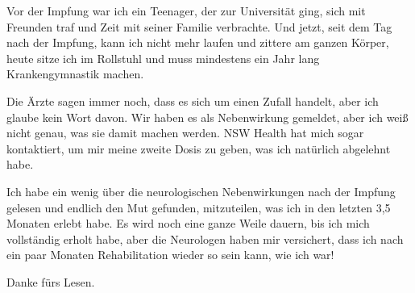 Vor der Impfung war ich ein Teenager, der zur Universität ging, sich mit
Freunden traf und Zeit mit seiner Familie verbrachte. Und jetzt, seit dem Tag
nach der Impfung, kann ich nicht mehr laufen und zittere am ganzen Körper, heute
sitze ich im Rollstuhl und muss mindestens ein Jahr lang Krankengymnastik
machen.

Die Ärzte sagen immer noch, dass es sich um einen Zufall handelt, aber ich
glaube kein Wort davon. Wir haben es als Nebenwirkung gemeldet, aber ich weiß
nicht genau, was sie damit machen werden. NSW Health hat mich sogar kontaktiert,
um mir meine zweite Dosis zu geben, was ich natürlich abgelehnt habe.

Ich habe ein wenig über die neurologischen Nebenwirkungen nach der Impfung
gelesen und endlich den Mut gefunden, mitzuteilen, was ich in den letzten 3,5
Monaten erlebt habe. Es wird noch eine ganze Weile dauern, bis ich mich
vollständig erholt habe, aber die Neurologen haben mir versichert, dass ich nach
ein paar Monaten Rehabilitation wieder so sein kann, wie ich war!

Danke fürs Lesen.
